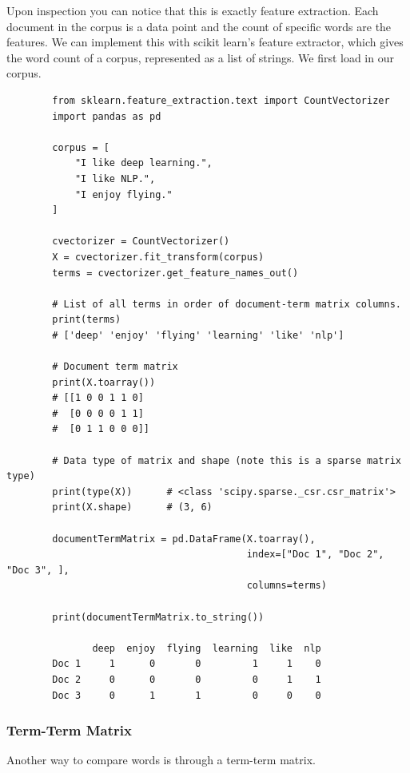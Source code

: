 \documentclass{article}
\begin{document}
      Upon inspection you can notice that this is exactly feature extraction. Each document in the corpus is a data point and the count of specific words are the features. We can implement this with scikit learn's feature extractor, which gives the word count of a corpus, represented as a list of strings. We first load in our corpus. 
      \begin{lstlisting}
        from sklearn.feature_extraction.text import CountVectorizer
        import pandas as pd

        corpus = [
            "I like deep learning.", 
            "I like NLP.", 
            "I enjoy flying."
        ]

        cvectorizer = CountVectorizer()
        X = cvectorizer.fit_transform(corpus)
        terms = cvectorizer.get_feature_names_out()

        # List of all terms in order of document-term matrix columns. 
        print(terms)
        # ['deep' 'enjoy' 'flying' 'learning' 'like' 'nlp']

        # Document term matrix 
        print(X.toarray())
        # [[1 0 0 1 1 0]
        #  [0 0 0 0 1 1]
        #  [0 1 1 0 0 0]]

        # Data type of matrix and shape (note this is a sparse matrix type) 
        print(type(X))      # <class 'scipy.sparse._csr.csr_matrix'> 
        print(X.shape)      # (3, 6) 

        documentTermMatrix = pd.DataFrame(X.toarray(),
                                          index=["Doc 1", "Doc 2", "Doc 3", ],
                                          columns=terms)

        print(documentTermMatrix.to_string())

               deep  enjoy  flying  learning  like  nlp
        Doc 1     1      0       0         1     1    0
        Doc 2     0      0       0         0     1    1
        Doc 3     0      1       1         0     0    0
      \end{lstlisting}

    \subsubsection{Term-Term Matrix}

      Another way to compare words is through a term-term matrix. 
\end{document}
